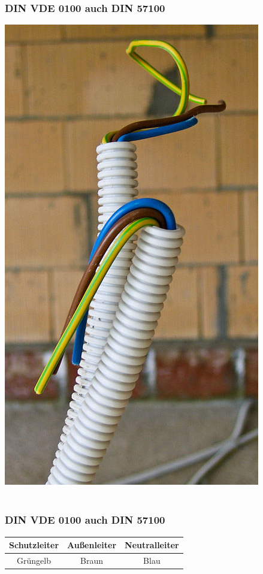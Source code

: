 \begin{frame}
    \frametitle{DIN VDE 0100 auch DIN 57100}
    \begin{center}
		\includegraphics[height=0.9\textheight]{a19/ElectricWireGrounded.jpg}\\
        \tiny \hyperlink{refs}{\cite{wm}} \\[1em]
    \end{center}
\end{frame}

\begin{frame}
    \frametitle{DIN VDE 0100 auch DIN 57100}
    \begin{center} \large
	\begin{tabular}{c|c|c}
  		Schutzleiter & Außenleiter & Neutralleiter \\ \hline \hline
  		Grüngelb & Braun & Blau \\
 	\end{tabular}
    \end{center}
\end{frame}

